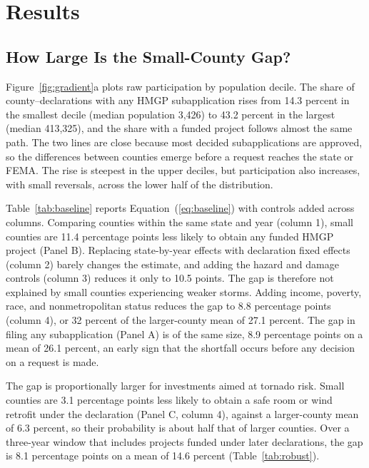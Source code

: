 \section{Results}
\label{sec:results}

\subsection{How Large Is the Small-County Gap?}
\label{sec:gap}

Figure~\ref{fig:gradient}a plots raw participation by population decile. The share of county--declarations with any HMGP subapplication rises from 14.3 percent in the smallest decile (median population 3,426) to 43.2 percent in the largest (median 413,325), and the share with a funded project follows almost the same path. The two lines are close because most decided subapplications are approved, so the differences between counties emerge before a request reaches the state or FEMA. The rise is steepest in the upper deciles, but participation also increases, with small reversals, across the lower half of the distribution.

Table~\ref{tab:baseline} reports Equation~(\ref{eq:baseline}) with controls added across columns. Comparing counties within the same state and year (column 1), small counties are 11.4 percentage points less likely to obtain any funded HMGP project (Panel B). Replacing state-by-year effects with declaration fixed effects (column 2) barely changes the estimate, and adding the hazard and damage controls (column 3) reduces it only to 10.5 points. The gap is therefore not explained by small counties experiencing weaker storms. Adding income, poverty, race, and nonmetropolitan status reduces the gap to 8.8 percentage points (column 4), or 32 percent of the larger-county mean of 27.1 percent. The gap in filing any subapplication (Panel A) is of the same size, 8.9 percentage points on a mean of 26.1 percent, an early sign that the shortfall occurs before any decision on a request is made.

The gap is proportionally larger for investments aimed at tornado risk. Small counties are 3.1 percentage points less likely to obtain a safe room or wind retrofit under the declaration (Panel C, column 4), against a larger-county mean of 6.3 percent, so their probability is about half that of larger counties. Over a three-year window that includes projects funded under later declarations, the gap is 8.1 percentage points on a mean of 14.6 percent (Table~\ref{tab:robust}).

